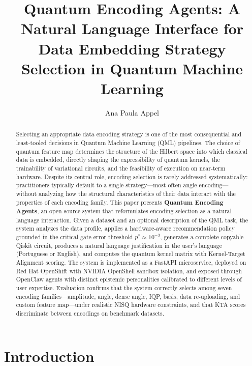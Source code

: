 \documentclass[sigconf,nonacm]{acmart}
\author{Ana Paula Appel}
\affiliation{%
  \institution{Red Hat, Inc.}
  \country{USA}
}
\title{Quantum Encoding Agents: A Natural Language Interface for\\
       Data Embedding Strategy Selection in Quantum Machine Learning}
\begin{document}
\begin{abstract}
Selecting an appropriate data encoding strategy is one of the most consequential
and least-tooled decisions in Quantum Machine Learning (QML) pipelines. The choice
of quantum feature map determines the structure of the Hilbert space into which
classical data is embedded, directly shaping the expressibility of quantum kernels,
the trainability of variational circuits, and the feasibility of execution on
near-term hardware. Despite its central role, encoding selection is rarely addressed
systematically: practitioners typically default to a single strategy---most often
angle encoding---without analyzing how the structural characteristics of their data
interact with the properties of each encoding family. This paper presents
\textbf{Quantum Encoding Agents}, an open-source system that reformulates encoding
selection as a natural language interaction. Given a dataset and an optional
description of the QML task, the system analyzes the data profile, applies a
hardware-aware recommendation policy grounded in the critical gate error threshold
$p^{*} \approx 10^{-3}$, generates a complete copyable Qiskit circuit, produces a
natural language justification in the user's language (Portuguese or English), and
computes the quantum kernel matrix with Kernel-Target Alignment scoring. The system
is implemented as a FastAPI microservice, deployed on Red Hat OpenShift with NVIDIA
OpenShell sandbox isolation, and exposed through OpenClaw agents with distinct
epistemic personalities calibrated to different levels of user expertise. Evaluation
confirms that the system correctly selects among seven encoding families---amplitude,
angle, dense angle, IQP, basis, data re-uploading, and custom feature map---under
realistic NISQ hardware constraints, and that KTA scores discriminate between
encodings on benchmark datasets.
\end{abstract}

\maketitle

\section{Introduction}
\end{document}
